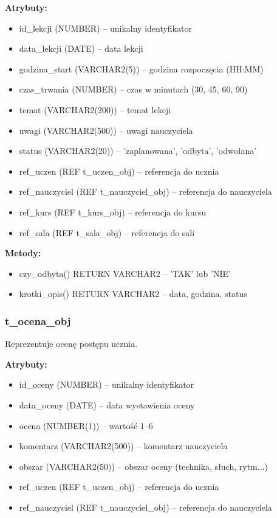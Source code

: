 \documentclass[12pt,a4paper]{article}
\begin{document}
\textbf{Atrybuty:}
\begin{itemize}[nosep]
    \item id\_lekcji (NUMBER) -- unikalny identyfikator
    \item data\_lekcji (DATE) -- data lekcji
    \item godzina\_start (VARCHAR2(5)) -- godzina rozpoczęcia (HH:MM)
    \item czas\_trwania (NUMBER) -- czas w minutach (30, 45, 60, 90)
    \item temat (VARCHAR2(200)) -- temat lekcji
    \item uwagi (VARCHAR2(500)) -- uwagi nauczyciela
    \item status (VARCHAR2(20)) -- 'zaplanowana', 'odbyta', 'odwołana'
    \item ref\_uczen (REF t\_uczen\_obj) -- referencja do ucznia
    \item ref\_nauczyciel (REF t\_nauczyciel\_obj) -- referencja do nauczyciela
    \item ref\_kurs (REF t\_kurs\_obj) -- referencja do kursu
    \item ref\_sala (REF t\_sala\_obj) -- referencja do sali
\end{itemize}

\textbf{Metody:}
\begin{itemize}[nosep]
    \item czy\_odbyta() RETURN VARCHAR2 -- 'TAK' lub 'NIE'
    \item krotki\_opis() RETURN VARCHAR2 -- data, godzina, status
\end{itemize}

\subsubsection{t\_ocena\_obj}
Reprezentuje ocenę postępu ucznia.

\textbf{Atrybuty:}
\begin{itemize}[nosep]
    \item id\_oceny (NUMBER) -- unikalny identyfikator
    \item data\_oceny (DATE) -- data wystawienia oceny
    \item ocena (NUMBER(1)) -- wartość 1--6
    \item komentarz (VARCHAR2(500)) -- komentarz nauczyciela
    \item obszar (VARCHAR2(50)) -- obszar oceny (technika, słuch, rytm...)
    \item ref\_uczen (REF t\_uczen\_obj) -- referencja do ucznia
    \item ref\_nauczyciel (REF t\_nauczyciel\_obj) -- referencja do nauczyciela
\end{itemize}
\end{document}
